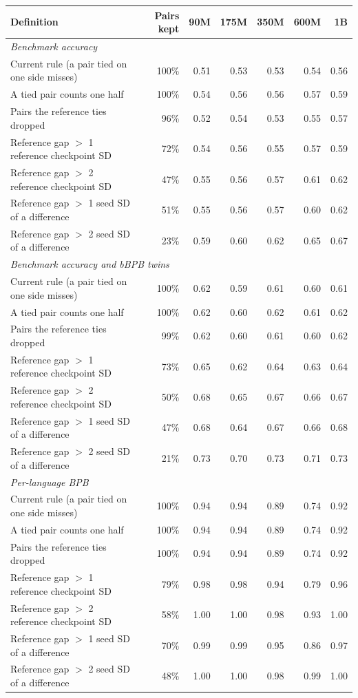 \begin{tabular}{lrrrrrr}
\toprule
Definition & Pairs kept & 90M & 175M & 350M & 600M & 1B \\
\midrule
\multicolumn{7}{l}{\textit{Benchmark accuracy}} \\
Current rule (a pair tied on one side misses) & 100\% & 0.51 & 0.53 & 0.53 & 0.54 & 0.56 \\
A tied pair counts one half & 100\% & 0.54 & 0.56 & 0.56 & 0.57 & 0.59 \\
Pairs the reference ties dropped & 96\% & 0.52 & 0.54 & 0.53 & 0.55 & 0.57 \\
Reference gap $>$ 1 reference checkpoint SD & 72\% & 0.54 & 0.56 & 0.55 & 0.57 & 0.59 \\
Reference gap $>$ 2 reference checkpoint SD & 47\% & 0.55 & 0.56 & 0.57 & 0.61 & 0.62 \\
Reference gap $>$ 1 seed SD of a difference & 51\% & 0.55 & 0.56 & 0.57 & 0.60 & 0.62 \\
Reference gap $>$ 2 seed SD of a difference & 23\% & 0.59 & 0.60 & 0.62 & 0.65 & 0.67 \\
\midrule
\multicolumn{7}{l}{\textit{Benchmark accuracy and bBPB twins}} \\
Current rule (a pair tied on one side misses) & 100\% & 0.62 & 0.59 & 0.61 & 0.60 & 0.61 \\
A tied pair counts one half & 100\% & 0.62 & 0.60 & 0.62 & 0.61 & 0.62 \\
Pairs the reference ties dropped & 99\% & 0.62 & 0.60 & 0.61 & 0.60 & 0.62 \\
Reference gap $>$ 1 reference checkpoint SD & 73\% & 0.65 & 0.62 & 0.64 & 0.63 & 0.64 \\
Reference gap $>$ 2 reference checkpoint SD & 50\% & 0.68 & 0.65 & 0.67 & 0.66 & 0.67 \\
Reference gap $>$ 1 seed SD of a difference & 47\% & 0.68 & 0.64 & 0.67 & 0.66 & 0.68 \\
Reference gap $>$ 2 seed SD of a difference & 21\% & 0.73 & 0.70 & 0.73 & 0.71 & 0.73 \\
\midrule
\multicolumn{7}{l}{\textit{Per-language BPB}} \\
Current rule (a pair tied on one side misses) & 100\% & 0.94 & 0.94 & 0.89 & 0.74 & 0.92 \\
A tied pair counts one half & 100\% & 0.94 & 0.94 & 0.89 & 0.74 & 0.92 \\
Pairs the reference ties dropped & 100\% & 0.94 & 0.94 & 0.89 & 0.74 & 0.92 \\
Reference gap $>$ 1 reference checkpoint SD & 79\% & 0.98 & 0.98 & 0.94 & 0.79 & 0.96 \\
Reference gap $>$ 2 reference checkpoint SD & 58\% & 1.00 & 1.00 & 0.98 & 0.93 & 1.00 \\
Reference gap $>$ 1 seed SD of a difference & 70\% & 0.99 & 0.99 & 0.95 & 0.86 & 0.97 \\
Reference gap $>$ 2 seed SD of a difference & 48\% & 1.00 & 1.00 & 0.98 & 0.99 & 1.00 \\
\bottomrule
\end{tabular}
